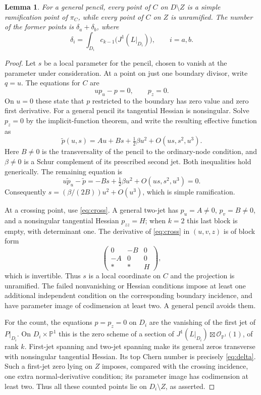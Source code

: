 \documentclass[11pt]{article}
\newtheorem{lemma}[theorem]{Lemma}
\newcommand{\PP}{\mathbb P}
\newcommand{\OO}{\mathcal O}
\begin{document}
\begin{lemma}\label{lem:boundary}
For a general pencil, every point of $C$ on $D\setminus Z$ is a simple
ramification point of $\pi_C$, while every point of $C$ on $Z$ is
unramified. The number of the former points is $\delta_a+\delta_b$,
where
\begin{equation}\label{eq:delta}
 \delta_i=\int_{D_i}c_{k-1}\bigl(J^1(L|_{D_i})\bigr),\qquad i=a,b.
\end{equation}
\end{lemma}
\begin{proof}
Let $s$ be a local parameter for the pencil, chosen to vanish at the
parameter under consideration. At a point on just one boundary
divisor, write $q=u$. The equations for $C$ are
\[
 up_u-p=0,\qquad p_z=0.
\]
On $u=0$ these state that $p$ restricted to the boundary has zero value
and zero first derivative. For a general pencil its tangential Hessian
is nonsingular. Solve $p_z=0$ by the implicit-function theorem, and
write the resulting effective function as
\[
 \widetilde p(u,s)=A u+B s+\tfrac12\beta u^2
        +O(us,s^2,u^3).
\]
Here $B\ne0$ is the transversality of the pencil to the ordinary-node
condition, and $\beta\ne0$ is a Schur complement of its prescribed
second jet. Both inequalities hold generically. The remaining
equation is
\[
 u\widetilde p_u-\widetilde p
    =-Bs+\tfrac12\beta u^2+O(us,s^2,u^3)=0.
\]
Consequently $s=(\beta/(2B))u^2+O(u^3)$, which is simple ramification.

At a crossing point, use \eqref{eq:cross}. A general two-jet has
$p_u=A\ne0$, $p_v=B\ne0$, and a nonsingular tangential Hessian
$p_{zz}=H$; when $k=2$ this last block is empty, with determinant one.
The derivative of \eqref{eq:cross} in $(u,v,z)$ is of block form
\[
 \begin{pmatrix}0&-B&0\\-A&0&0\\ *&*&H\end{pmatrix},
\]
which is invertible. Thus $s$ is a local coordinate on $C$ and the
projection is unramified. The failed nonvanishing or Hessian
conditions impose at least one additional independent condition on
the corresponding boundary incidence, and have parameter image of
codimension at least two. A general pencil avoids them.

For the count, the equations $p=p_z=0$ on $D_i$ are the vanishing of
the first jet of $P|_{D_i}$. On $D_i\times\PP^1$ this is the zero
scheme of a section of
$J^1(L|_{D_i})\boxtimes\OO_{\PP^1}(1)$, of rank $k$. First-jet
spanning and two-jet spanning make its general zeros transverse with
nonsingular tangential Hessian. Its top Chern number is precisely
\eqref{eq:delta}. Such a first-jet zero lying on $Z$ imposes, compared
with the crossing incidence, one extra normal-derivative condition;
its parameter image has codimension at least two. Thus all these
counted points lie on $D_i\setminus Z$, as asserted.
\end{proof}
\end{document}
